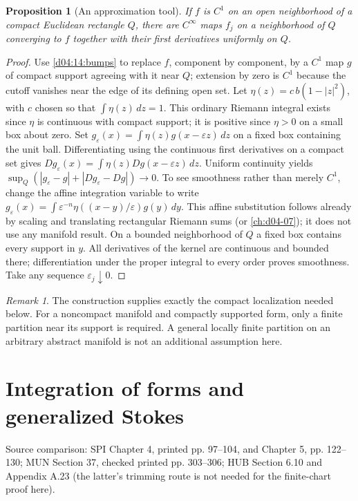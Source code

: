 \documentclass[11pt,oneside,openany]{book}
\newtheorem{proposition}[theorem]{Proposition}
\theoremstyle{definition}
\theoremstyle{remark}
\newtheorem{remark}[theorem]{Remark}
\newcommand{\eps}{\varepsilon}
\newcommand{\source}[1]{\par\begingroup\small\sffamily\color{black!65}Source comparison: #1\par\endgroup}
\begin{document}
\begin{proposition}[An approximation tool]\label{d04:14:mollify}
If $f$ is $C^1$ on an open neighborhood of a compact Euclidean rectangle
$Q$, there are $C^\infty$ maps $f_j$ on a neighborhood of $Q$ converging
to $f$ together with their first derivatives uniformly on $Q$.
\end{proposition}
\begin{proof}
Use \cref{d04:14:bumps} to replace $f$, component by component, by a $C^1$
map $g$ of compact support agreeing with it near $Q$; extension by zero is
$C^1$ because the cutoff vanishes near the edge of its defining open set.
Let $\eta(z)=c\,b(1-|z|^2)$, with $c$ chosen so that
$\int\eta(z)\,dz=1$. This ordinary Riemann integral exists since $\eta$
is continuous with compact support; it is positive since $\eta>0$ on a
small box about zero. Set
$g_\eps(x)=\int\eta(z)g(x-\eps z)\,dz$ on a fixed box containing the unit
ball. Differentiating using the continuous first derivatives on a compact
set gives $Dg_\eps(x)=\int\eta(z)Dg(x-\eps z)\,dz$.
Uniform continuity yields
$\sup_Q(|g_\eps-g|+|Dg_\eps-Dg|)\to0$.
To see smoothness rather than merely $C^1$, change the affine integration
variable to write
$g_\eps(x)=\int\eps^{-n}\eta((x-y)/\eps)g(y)\,dy$.
This affine substitution follows already by scaling and translating
rectangular Riemann sums (or \cref{ch:d04-07}); it does not use any manifold
result. On a bounded neighborhood of $Q$ a fixed box contains every support
in $y$. All derivatives of the kernel are continuous and bounded there;
differentiation under the proper integral to every order proves smoothness.
Take any sequence $\eps_j\downarrow0$.
\end{proof}

\begin{remark}\label{d04:14:scope}
The construction supplies exactly the compact localization needed below.
For a noncompact manifold and compactly supported form, only a finite
partition near its support is required. A general locally finite partition
on an arbitrary abstract manifold is not an additional assumption here.
\end{remark}



\chapter{Integration of forms and generalized Stokes}
\label{ch:d04-15}
\source{SPI Chapter 4, printed pp. 97--104, and Chapter 5, pp. 122--130; MUN Section 37, checked printed pp. 303--306; HUB Section 6.10 and Appendix A.23 (the latter's trimming route is not needed for the finite-chart proof here).}
\end{document}
